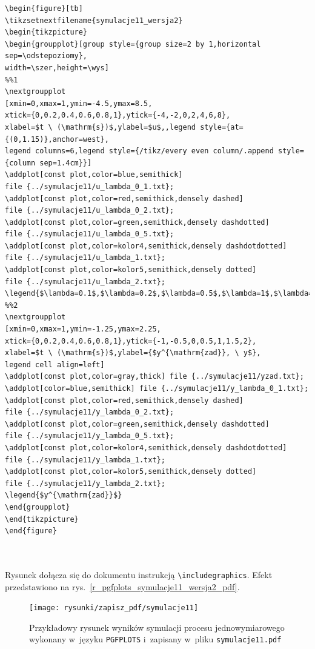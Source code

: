 \begin{lstlisting}[style=customlatex,frame=single]
\begin{figure}[tb]
\tikzsetnextfilename{symulacje11_wersja2}
\begin{tikzpicture}
\begin{groupplot}[group style={group size=2 by 1,horizontal sep=\odstepoziomy},
width=\szer,height=\wys]
%%1
\nextgroupplot
[xmin=0,xmax=1,ymin=-4.5,ymax=8.5,
xtick={0,0.2,0.4,0.6,0.8,1},ytick={-4,-2,0,2,4,6,8},
xlabel=$t \ (\mathrm{s})$,ylabel=$u$,,legend style={at={(0,1.15)},anchor=west},
legend columns=6,legend style={/tikz/every even column/.append style=
{column sep=1.4cm}}]
\addplot[const plot,color=blue,semithick]
file {../symulacje11/u_lambda_0_1.txt};
\addplot[const plot,color=red,semithick,densely dashed]
file {../symulacje11/u_lambda_0_2.txt};
\addplot[const plot,color=green,semithick,densely dashdotted]
file {../symulacje11/u_lambda_0_5.txt};
\addplot[const plot,color=kolor4,semithick,densely dashdotdotted]
file {../symulacje11/u_lambda_1.txt};
\addplot[const plot,color=kolor5,semithick,densely dotted]
file {../symulacje11/u_lambda_2.txt};
\legend{$\lambda=0.1$,$\lambda=0.2$,$\lambda=0.5$,$\lambda=1$,$\lambda=2$}
%%2
\nextgroupplot
[xmin=0,xmax=1,ymin=-1.25,ymax=2.25,
xtick={0,0.2,0.4,0.6,0.8,1},ytick={-1,-0.5,0,0.5,1,1.5,2},
xlabel=$t \ (\mathrm{s})$,ylabel={$y^{\mathrm{zad}}, \ y$},
legend cell align=left]
\addplot[const plot,color=gray,thick] file {../symulacje11/yzad.txt};
\addplot[color=blue,semithick] file {../symulacje11/y_lambda_0_1.txt};
\addplot[const plot,color=red,semithick,densely dashed]
file {../symulacje11/y_lambda_0_2.txt};
\addplot[const plot,color=green,semithick,densely dashdotted]
file {../symulacje11/y_lambda_0_5.txt};
\addplot[const plot,color=kolor4,semithick,densely dashdotdotted]
file {../symulacje11/y_lambda_1.txt};
\addplot[const plot,color=kolor5,semithick,densely dotted]
file {../symulacje11/y_lambda_2.txt};
\legend{$y^{\mathrm{zad}}$}
\end{groupplot}
\end{tikzpicture}
\end{figure}



\end{lstlisting}
Rysunek dołącza się do dokumentu instrukcją \verb+\includegraphics+. Efekt przedstawiono na rys.~\ref{r_pgfplots_symulacje11_wersja2_pdf}.

\begin{figure}[tb]
\centering
\texttt{[image: rysunki/zapisz\_pdf/symulacje11]}
\caption{Przykładowy rysunek wyników symulacji procesu jednowymiarowego wykonany
w~języku \texttt{PGFPLOTS} i~zapisany w~pliku \texttt{symulacje11.pdf}}
\label{r_pgfplots_symulacje11_pdf}
\end{figure}

